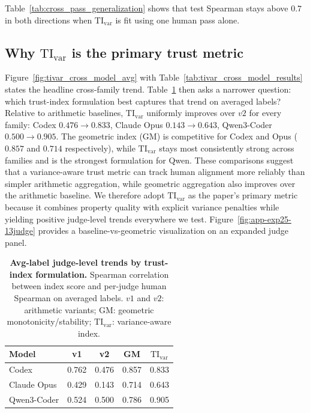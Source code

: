 \documentclass{article}
\begin{document}
Table~\ref{tab:cross_pass_generalization} shows that test Spearman stays above \(0.7\) in both directions when \(\mathrm{TI}_{\mathrm{var}}\) is fit using one human pass alone.

\subsection{Why \texorpdfstring{\(\mathrm{TI}_{\mathrm{var}}\)}{TI-var} is the primary trust metric}
Figure~\ref{fig:tivar_cross_model_avg} with Table~\ref{tab:tivar_cross_model_results} states the headline cross-family trend. Table~\ref{tab:cross_model_index_compare_avg} then asks a narrower question: which trust-index formulation best captures that trend on averaged labels? Relative to arithmetic baselines, \(\mathrm{TI}_{\mathrm{var}}\) uniformly improves over \(v2\) for every family: Codex \(0.476\!\rightarrow\!0.833\), Claude Opus \(0.143\!\rightarrow\!0.643\), Qwen3-Coder \(0.500\!\rightarrow\!0.905\). The geometric index (GM) is competitive for Codex and Opus (\(0.857\) and \(0.714\) respectively), while \(\mathrm{TI}_{\mathrm{var}}\) stays most consistently strong across families and is the strongest formulation for Qwen. These comparisons suggest that a variance-aware trust metric can track human alignment more reliably than simpler arithmetic aggregation, while geometric aggregation also improves over the arithmetic baseline. We therefore adopt \(\mathrm{TI}_{\mathrm{var}}\) as the paper's primary metric because it combines property quality with explicit variance penalties while yielding positive judge-level trends everywhere we test. Figure~\ref{fig:app-exp25-13judge} provides a baseline-vs-geometric visualization on an expanded judge panel.

\begin{table}[t]
  \centering
  \small
  \begin{tabular}{lcccc}
    \toprule
    \textbf{Model} & \textbf{v1} & \textbf{v2} & \textbf{GM} & $\mathrm{TI}_{\mathrm{var}}$ \\
    \midrule
    Codex          & 0.762       & 0.476       & 0.857       & 0.833                        \\
    Claude Opus    & 0.429       & 0.143       & 0.714       & 0.643                        \\
    Qwen3-Coder    & 0.524       & 0.500       & 0.786       & 0.905                        \\
    \bottomrule
  \end{tabular}
  \caption{\textbf{Avg-label judge-level trends by trust-index formulation.}
  Spearman correlation between index score and per-judge human Spearman on averaged labels.
  \(v1\) and \(v2\): arithmetic variants; GM: geometric monotonicity/stability; \(\mathrm{TI}_{\mathrm{var}}\): variance-aware index.}
  \label{tab:cross_model_index_compare_avg}
\end{table}
\end{document}
